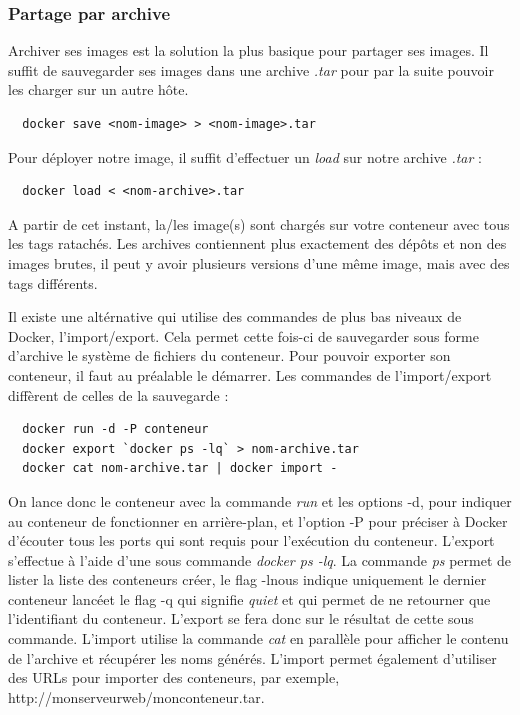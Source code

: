 \documentclass[12pt,a4paper]{article}
\begin{document}
\subsubsection{Partage par archive}

Archiver ses images est la solution la plus basique pour partager ses images. Il suffit de sauvegarder ses images dans une archive \textit{.tar} pour par la suite pouvoir les charger sur un autre hôte.
\begin{lstlisting}
  docker save <nom-image> > <nom-image>.tar
\end{lstlisting}

Pour déployer notre image, il suffit d'effectuer un \textit{load} sur notre archive \textit{.tar} :

\begin{lstlisting}
  docker load < <nom-archive>.tar
\end{lstlisting}

A partir de cet instant, la/les image(s) sont chargés sur votre conteneur avec tous les tags ratachés. Les archives contiennent plus exactement des dépôts et non des images brutes, il peut y avoir plusieurs versions d'une même image, mais avec des tags différents.

Il existe une altérnative qui utilise des commandes de plus bas niveaux de Docker, l'import/export. Cela permet cette fois-ci de sauvegarder sous forme d'archive le système de fichiers du conteneur. Pour pouvoir exporter son conteneur, il faut au préalable le démarrer. Les commandes de l'import/export diffèrent de celles de la sauvegarde :

\begin{lstlisting}
  docker run -d -P conteneur
  docker export `docker ps -lq` > nom-archive.tar
  docker cat nom-archive.tar | docker import -
\end{lstlisting}

On lance donc le conteneur avec la commande \textit{run} et les options -d, pour indiquer au conteneur de fonctionner en arrière-plan, et l'option -P pour préciser à Docker d'écouter tous les ports qui sont requis pour l'exécution du conteneur. L'export s'effectue à l'aide d'une sous commande \textit{docker ps -lq}. La commande \textit{ps} permet de lister la liste des conteneurs créer, le flag -lnous indique uniquement le dernier conteneur lancéet le flag -q qui signifie \textit{quiet} et qui permet de ne retourner que l'identifiant du conteneur. L'export se fera donc sur le résultat de cette sous commande. L'import utilise la commande \textit{cat} en parallèle pour afficher le contenu de l'archive et récupérer les noms générés. L'import permet également d'utiliser des URLs pour importer des conteneurs, par exemple, http://monserveurweb/monconteneur.tar.
\end{document}
